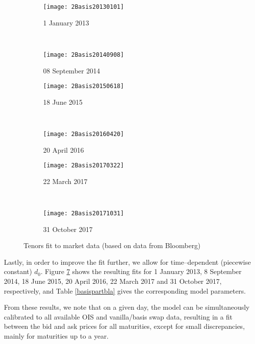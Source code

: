 \documentclass[12pt,a4paper]{article}
\theoremstyle{plain}
\numberwithin{equation}{section}
\begin{document}
\begin{figure}[t]
  \centering
    \begin{subfigure}[b]{0.53\textwidth}
        \texttt{[image: 2Basis20130101]}
        \caption{1 January 2013}
        \label{fig:ud}
    \end{subfigure}
    ~
        \begin{subfigure}[b]{0.53\textwidth}
        \texttt{[image: 2Basis20140908]}
       \caption{08 September 2014}
        \label{figxd}
    \end{subfigure}

    \begin{subfigure}[b]{0.53\textwidth}
        \texttt{[image: 2Basis20150618]}
       \caption{18 June 2015}
        \label{figxd}
    \end{subfigure}
    ~
    \begin{subfigure}[b]{0.53\textwidth}
        \texttt{[image: 2Basis20160420]}
       \caption{20 April 2016}
        \label{figxb}
    \end{subfigure}

     \begin{subfigure}[b]{0.53\textwidth}
        \texttt{[image: 2Basis20170322]}
       \caption{22 March 2017}
        \label{figx}
    \end{subfigure}
    ~
     \begin{subfigure}[b]{0.53\textwidth}
        \texttt{[image: 2Basis20171031]}
       \caption{31 October 2017}
        \label{figxa}
    \end{subfigure}
\caption{Tenors fit to market data  (based on data from Bloomberg)}\label{basisfit}
\end{figure}

Lastly, in order to improve the fit further, we allow for time--dependent (piecewise constant) $d_0$. Figure \ref{basisfit} shows
the resulting fits for 1 January 2013, 8 September 2014, 18 June 2015, 20 April 2016, 22 March 2017 and 31 October 2017, respectively, and Table \ref{basispartbla} gives the corresponding model parameters.

From these results, we note that on a given day, the model can be simultaneously calibrated to all available OIS and vanilla/basis swap data, resulting in a fit between the bid and ask prices for all maturities, except for small discrepancies, mainly for maturities up to a year.



\end{document}
